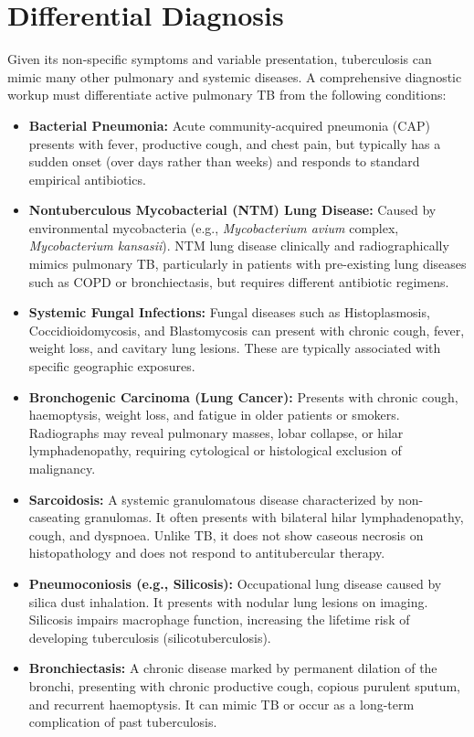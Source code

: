 \section*{Differential Diagnosis}
Given its non-specific symptoms and variable presentation, tuberculosis can mimic many other pulmonary and systemic diseases. A comprehensive diagnostic workup must differentiate active pulmonary TB from the following conditions:
\begin{itemize}
    \item \textbf{Bacterial Pneumonia:} Acute community-acquired pneumonia (CAP) presents with fever, productive cough, and chest pain, but typically has a sudden onset (over days rather than weeks) and responds to standard empirical antibiotics.
    \item \textbf{Nontuberculous Mycobacterial (NTM) Lung Disease:} Caused by environmental mycobacteria (e.g., \textit{Mycobacterium avium} complex, \textit{Mycobacterium kansasii}). NTM lung disease clinically and radiographically mimics pulmonary TB, particularly in patients with pre-existing lung diseases such as COPD or bronchiectasis, but requires different antibiotic regimens.
    \item \textbf{Systemic Fungal Infections:} Fungal diseases such as Histoplasmosis, Coccidioidomycosis, and Blastomycosis can present with chronic cough, fever, weight loss, and cavitary lung lesions. These are typically associated with specific geographic exposures.
    \item \textbf{Bronchogenic Carcinoma (Lung Cancer):} Presents with chronic cough, haemoptysis, weight loss, and fatigue in older patients or smokers. Radiographs may reveal pulmonary masses, lobar collapse, or hilar lymphadenopathy, requiring cytological or histological exclusion of malignancy.
    \item \textbf{Sarcoidosis:} A systemic granulomatous disease characterized by non-caseating granulomas. It often presents with bilateral hilar lymphadenopathy, cough, and dyspnoea. Unlike TB, it does not show caseous necrosis on histopathology and does not respond to antitubercular therapy.
    \item \textbf{Pneumoconiosis (e.g., Silicosis):} Occupational lung disease caused by silica dust inhalation. It presents with nodular lung lesions on imaging. Silicosis impairs macrophage function, increasing the lifetime risk of developing tuberculosis (silicotuberculosis).
    \item \textbf{Bronchiectasis:} A chronic disease marked by permanent dilation of the bronchi, presenting with chronic productive cough, copious purulent sputum, and recurrent haemoptysis. It can mimic TB or occur as a long-term complication of past tuberculosis.

\end{itemize}
